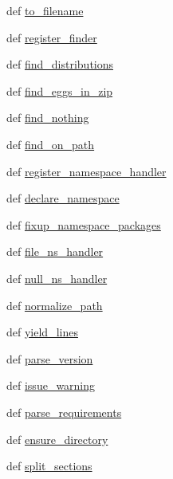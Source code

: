 \begin{DoxyCompactItemize}
def \hyperlink{namespacepkg__resources_a777a2d614bc635989286db3a5295def9}{to\+\_\+filename}
\item 
def \hyperlink{namespacepkg__resources_a75c9bb7752321869580051af5520c4ef}{register\+\_\+finder}
\item 
def \hyperlink{namespacepkg__resources_a8ff4a57ae1cf741f177f3df5eb97a6ce}{find\+\_\+distributions}
\item 
def \hyperlink{namespacepkg__resources_a2289faca414b07ed1a1e316e4eecd9f2}{find\+\_\+eggs\+\_\+in\+\_\+zip}
\item 
def \hyperlink{namespacepkg__resources_a1d1bba27535a218027710fada8d179dc}{find\+\_\+nothing}
\item 
def \hyperlink{namespacepkg__resources_aeddb58a8b08d7bb72935279eae081b2c}{find\+\_\+on\+\_\+path}
\item 
def \hyperlink{namespacepkg__resources_a86c55909fd17950be6a7e0d5a1198f3c}{register\+\_\+namespace\+\_\+handler}
\item 
def \hyperlink{namespacepkg__resources_a82091b43ef67497e37d0cc3fd48faaa2}{declare\+\_\+namespace}
\item 
def \hyperlink{namespacepkg__resources_aadde6bf261ec6276ca4bf5d3cf944676}{fixup\+\_\+namespace\+\_\+packages}
\item 
def \hyperlink{namespacepkg__resources_aeb7a4d4ac25e8e09ec9ec55924f4a36a}{file\+\_\+ns\+\_\+handler}
\item 
def \hyperlink{namespacepkg__resources_a1d62631a30234fc45d03bd56ea1bf997}{null\+\_\+ns\+\_\+handler}
\item 
def \hyperlink{namespacepkg__resources_addc9d89b8b9ce3c9edcf2a55805bfe95}{normalize\+\_\+path}
\item 
def \hyperlink{namespacepkg__resources_a129c476e32d8895042e8d913dee567dd}{yield\+\_\+lines}
\item 
def \hyperlink{namespacepkg__resources_a041a59732d5f6be023d3de5ca373a542}{parse\+\_\+version}
\item 
def \hyperlink{namespacepkg__resources_a53d2a3444cdbcb93b6e58684b9c85c98}{issue\+\_\+warning}
\item 
def \hyperlink{namespacepkg__resources_abeeb6d594606a8be808fc7159c214b47}{parse\+\_\+requirements}
\item 
def \hyperlink{namespacepkg__resources_a1d4e7dd5e9b3d056e35bad19ac3c0753}{ensure\+\_\+directory}
\item 
def \hyperlink{namespacepkg__resources_ad3f193156590661e9d37668bbe643ba0}{split\+\_\+sections}
\end{DoxyCompactItemize}
